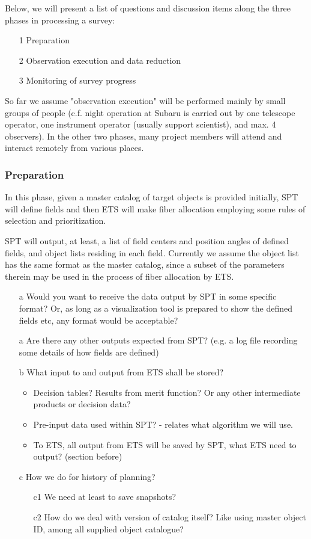 \documentclass[a4paper,notitlepage]{article}
\begin{document}
Below, we will present a list of questions and discussion items along
the three phases in processing a survey:
\begin{enumerate}
  \item[1] Preparation 
  \item[2] Observation execution and data reduction
  \item[3] Monitoring of survey progress
\end{enumerate}
So far we assume "observation execution" will be performed mainly by
small groups of people (c.f. night operation at Subaru is carried out by
one telescope operator, one instrument operator (usually support
scientist), and max. 4 observers). In the other two phases, many project
members will attend and interact remotely from various places.

\subsubsection{Preparation}

In this phase, given a master catalog of target objects is provided
initially, SPT will define fields and then ETS will make fiber
allocation employing some rules of selection and prioritization.

SPT will output, at least, a list of field centers and position angles
of defined fields, and object lists residing in each field. Currently we
assume the object list has the same format as the master catalog, since
a subset of the parameters therein may be used in the process of fiber
allocation by ETS.

\begin{enumerate}
  \item[a] Would you want to receive the data output by SPT in some
    specific format? Or, as long as a visualization tool is prepared
    to show the defined fields etc, any format would be acceptable?
  \item[a] Are there any other outputs expected from SPT? (e.g. a log
    file recording some details of how fields are defined)
  \item[b] What input to and output from ETS shall be stored?
    \begin{itemize}
      \item Decision tables? Results from merit function? Or any other 
        intermediate products or decision data?
      \item Pre-input data used within SPT? - relates what algorithm we will use.
      \item To ETS, all output from ETS will be saved by SPT, what ETS need 
        to output? (section before)
    \end{itemize}
  \item[c] How we do for history of planning?
    \begin{enumerate}
      \item[c1] We need at least to save snapshots?
      \item[c2] How do we deal with version of catalog itself? Like using master 
        object ID, among all supplied object catalogue?
    \end{enumerate}
\end{enumerate}
\end{document}
